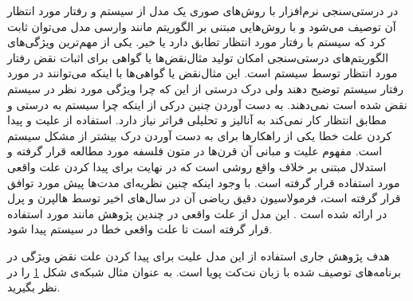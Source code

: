 در درستی‌سنجی نرم‌افزار با روش‌های صوری یک مدل از سیستم و رفتار 
مورد انتظار آن توصیف می‌شود و با روش‌هایی مبتنی بر الگوریتم مانند وارسی مدل
 \cite{clarke1997model}
می‌توان ثابت کرد که سیستم با رفتار مورد انتظار تطابق دارد یا خیر.
یکی از مهم‌ترین ویژگی‌های الگوریتم‌های درستی‌سنجی امکان تولید مثال‌نقض‌ها
یا گواهی
برای اثبات نقض رفتار مورد انتظار توسط سیستم است.
این مثال‌نقض‌ یا گواهی‌ها با اینکه می‌توانند در مورد رفتار سیستم توضیح دهند ولی درک درستی از این که چرا ویژگی مورد نظر در سیستم نقض شده است نمی‌دهند.
به دست آوردن چنین درکی از اینکه چرا سیستم به درستی و مطابق انتظار کار نمی‌کند به آنالیز و تحلیلی فراتر نیاز دارد.
استفاده از علیت
و پیدا کردن علت خطا
یکی از راهکار‌ها برای به دست آوردن درک بیشتر از مشکل سیستم است.
مفهوم علیت و مبانی آن قرن‌ها در متون فلسفه مورد مطالعه قرار گرفته و استدلال مبتنی بر خلاف واقع روشی است که در نهایت برای پیدا کردن علت واقعی مورد استفاده قرار گرفته است.
با وجود اینکه چنین نظریه‌ای مدت‌ها پیش مورد توافق قرار گرفته است، فرمولاسیون دقیق ریاضی آن در سال‌های اخیر توسط هالپرن
و پرل
در 
\cite{hp}
ارائه شده است \cite{explications}.
این مدل از علت واقعی در چندین پژوهش مانند 
\cite{Caltais-LTL,causal-hml,causality-checking,chockler}
 مورد استفاده قرار گرفته است تا علت واقعی خطا در سیستم پیدا شود. 
\begin{figure}
    \centering
    \caption{ }
    \label{fig:intro:example}
\end{figure}
 هدف پژوهش جاری استفاده از این مدل علیت برای پیدا کردن علت نقض 
ویژگی در برنامه‌های توصیف شده با زبان نت‌کت پویا است.
به عنوان مثال شبکه‌ی شکل 
\ref{fig:intro:example}
را در نظر بگیرید.

